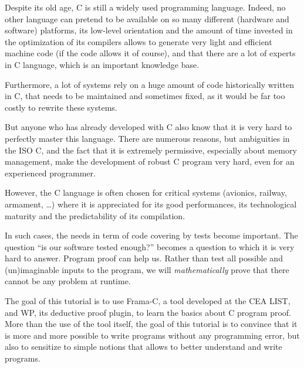 \documentclass[12pt,francais,]{scrbook}
\begin{document}
Despite its old age, C is still a widely used programming language.
Indeed, no other language can pretend to be available on so many
different (hardware and software) platforms, its low-level orientation
and the amount of time invested in the optimization of its compilers
allows to generate very light and efficient machine code (if the code
allows it of course), and that there are a lot of experts in C language,
which is an important knowledge base.

Furthermore, a lot of systems rely on a huge amount of code historically
written in C, that needs to be maintained and sometimes fixed, as it
would be far too costly to rewrite these systems.

But anyone who has already developed with C also know that it is very
hard to perfectly master this language. There are numerous reasons, but
ambiguities in the ISO C, and the fact that it is extremely permissive,
especially about memory management, make the development of robust C
program very hard, even for an experienced programmer.

However, the C language is often chosen for critical systems (avionics,
railway, armament, \ldots{}) where it is appreciated for its good
performances, its technological maturity and the predictability of its
compilation.

In such cases, the needs in term of code covering by tests become
important. The question ``is our software tested enough?'' becomes a
question to which it is very hard to answer. Program proof can help us.
Rather than test all possible and (un)imaginable inputs to the program,
we will \emph{mathematically} prove that there cannot be any problem at
runtime.

The goal of this tutorial is to use Frama-C, a tool developed at the CEA
LIST, and WP, its deductive proof plugin, to learn the basics about C
program proof. More than the use of the tool itself, the goal of this
tutorial is to convince that it is more and more possible to write
programs without any programming error, but also to sensitize to simple
notions that allows to better understand and write programs.
\end{document}
